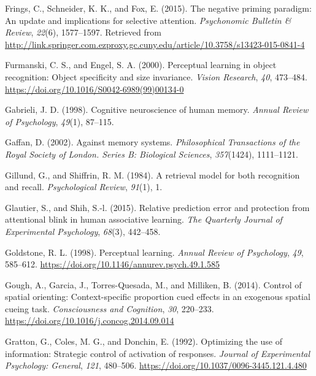 \documentclass[]{DissertateCUNY}
\begin{document}
\leavevmode\hypertarget{ref-frings_negative_2015}{}%
Frings, C., Schneider, K. K., and Fox, E. (2015). The negative priming
paradigm: An update and implications for selective attention.
\emph{Psychonomic Bulletin \& Review}, \emph{22}(6), 1577--1597.
Retrieved from
\url{http://link.springer.com.ezproxy.gc.cuny.edu/article/10.3758/s13423-015-0841-4}

\leavevmode\hypertarget{ref-furmanski_perceptual_2000}{}%
Furmanski, C. S., and Engel, S. A. (2000). Perceptual learning in object
recognition: Object specificity and size invariance. \emph{Vision
Research}, \emph{40}, 473--484.
\url{https://doi.org/10.1016/S0042-6989(99)00134-0}

\leavevmode\hypertarget{ref-gabrieli_cognitive_1998}{}%
Gabrieli, J. D. (1998). Cognitive neuroscience of human memory.
\emph{Annual Review of Psychology}, \emph{49}(1), 87--115.

\leavevmode\hypertarget{ref-gaffan_against_2002}{}%
Gaffan, D. (2002). Against memory systems. \emph{Philosophical
Transactions of the Royal Society of London. Series B: Biological
Sciences}, \emph{357}(1424), 1111--1121.

\leavevmode\hypertarget{ref-gillund_retrieval_1984}{}%
Gillund, G., and Shiffrin, R. M. (1984). A retrieval model for both
recognition and recall. \emph{Psychological Review}, \emph{91}(1), 1.

\leavevmode\hypertarget{ref-glautier_relative_2015}{}%
Glautier, S., and Shih, S.-l. (2015). Relative prediction error and
protection from attentional blink in human associative learning.
\emph{The Quarterly Journal of Experimental Psychology}, \emph{68}(3),
442--458.

\leavevmode\hypertarget{ref-goldstone_perceptual_1998}{}%
Goldstone, R. L. (1998). Perceptual learning. \emph{Annual Review of
Psychology}, \emph{49}, 585--612.
\url{https://doi.org/10.1146/annurev.psych.49.1.585}

\leavevmode\hypertarget{ref-gough_control_2014}{}%
Gough, A., Garcia, J., Torres-Quesada, M., and Milliken, B. (2014).
Control of spatial orienting: Context-specific proportion cued effects
in an exogenous spatial cueing task. \emph{Consciousness and Cognition},
\emph{30}, 220--233. \url{https://doi.org/10.1016/j.concog.2014.09.014}

\leavevmode\hypertarget{ref-gratton_optimizing_1992}{}%
Gratton, G., Coles, M. G., and Donchin, E. (1992). Optimizing the use of
information: Strategic control of activation of responses. \emph{Journal
of Experimental Psychology: General}, \emph{121}, 480--506.
\url{https://doi.org/10.1037/0096-3445.121.4.480}
\end{document}

